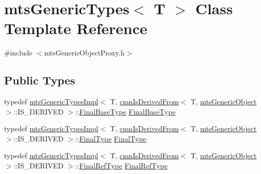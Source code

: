 \hypertarget{classmts_generic_types}{}\section{mts\+Generic\+Types$<$ T $>$ Class Template Reference}
\label{classmts_generic_types}


{\ttfamily \#include $<$mts\+Generic\+Object\+Proxy.\+h$>$}

\subsection*{Public Types}
\begin{DoxyCompactItemize}
\item 
typedef \hyperlink{classmts_generic_types_impl}{mts\+Generic\+Types\+Impl}$<$ T, \hyperlink{classcmn_is_derived_from}{cmn\+Is\+Derived\+From}$<$ T, \hyperlink{classmts_generic_object}{mts\+Generic\+Object} $>$\+::I\+S\+\_\+\+D\+E\+R\+I\+V\+E\+D $>$\+::\hyperlink{classmts_generic_types_a3244938027eee22c5703687330f0c172}{Final\+Base\+Type} \hyperlink{classmts_generic_types_a3244938027eee22c5703687330f0c172}{Final\+Base\+Type}
\item 
typedef \hyperlink{classmts_generic_types_impl}{mts\+Generic\+Types\+Impl}$<$ T, \hyperlink{classcmn_is_derived_from}{cmn\+Is\+Derived\+From}$<$ T, \hyperlink{classmts_generic_object}{mts\+Generic\+Object} $>$\+::I\+S\+\_\+\+D\+E\+R\+I\+V\+E\+D $>$\+::\hyperlink{classmts_generic_types_a1a1059969fe457db53790bd0e8274715}{Final\+Type} \hyperlink{classmts_generic_types_a1a1059969fe457db53790bd0e8274715}{Final\+Type}
\item 
typedef \hyperlink{classmts_generic_types_impl}{mts\+Generic\+Types\+Impl}$<$ T, \hyperlink{classcmn_is_derived_from}{cmn\+Is\+Derived\+From}$<$ T, \hyperlink{classmts_generic_object}{mts\+Generic\+Object} $>$\+::I\+S\+\_\+\+D\+E\+R\+I\+V\+E\+D $>$\+::\hyperlink{classmts_generic_types_a368d13fc9b20309385e9a40bbbe3c2ca}{Final\+Ref\+Type} \hyperlink{classmts_generic_types_a368d13fc9b20309385e9a40bbbe3c2ca}{Final\+Ref\+Type}
\end{DoxyCompactItemize}
